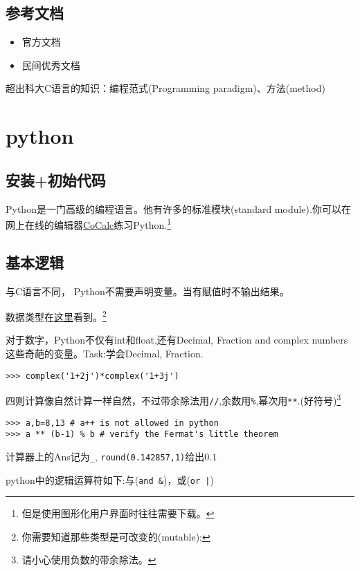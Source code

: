 \documentclass[11pt]{amsart}
\begin{document}
\subsection{参考文档}
\begin{itemize}
	\item 官方文档
	\item 民间优秀文档
\end{itemize}


超出科大C语言的知识：编程范式(Programming paradigm)、方法(method)



\section{python}
\subsection{安装+初始代码}
Python是一门高级的编程语言。他有许多的标准模块(standard module).你可以在网上在线的编辑器\href{https://cocalc.com/projects}{CoCalc}练习Python.\footnote{但是使用图形化用户界面时往往需要下载。}
\subsection{基本逻辑}
与C语言不同， Python不需要声明变量。当有赋值时不输出结果。

数据类型在\href{https://docs.python.org/3/tutorial/introduction.html#id3}{这里}看到。\footnote{你需要知道那些类型是可改变的(mutable);}

对于数字，Python不仅有int和float,还有Decimal, Fraction and complex numbers这些奇葩的变量。Task:学会Decimal, Fraction.
\begin{lstlisting}[language=iPython]
>>> complex('1+2j')*complex('1+3j')
\end{lstlisting}
四则计算像自然计算一样自然，不过带余除法用\lstinline|//|,余数用\lstinline|%|,幂次用\lstinline|**|.(好符号)\footnote{请小心使用负数的带余除法。}
\begin{lstlisting}[language=iPython]
>>> a,b=8,13 # a++ is not allowed in python
>>> a ** (b-1) % b # verify the Fermat's little theorem
\end{lstlisting}
计算器上的Ans记为\lstinline|_|, \lstinline|round(0.142857,1)|给出$0.1$

python中的逻辑运算符如下:与(\lstinline|and &|)，或(\lstinline{or |})
\end{document}

